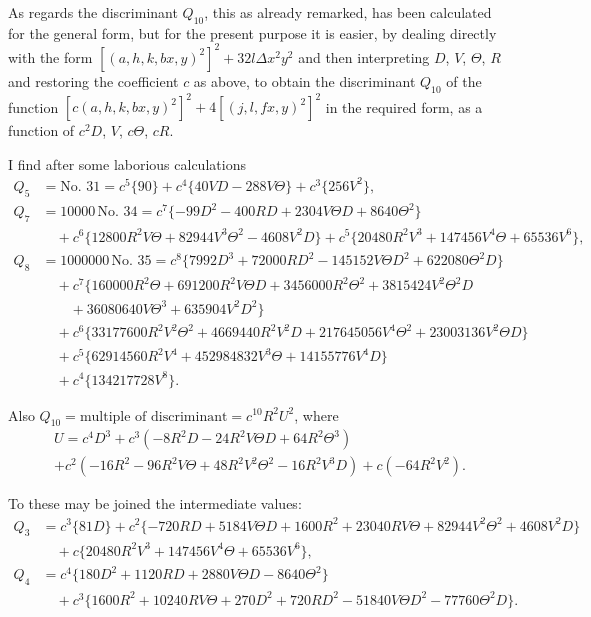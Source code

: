 \documentclass[11pt,a4paper]{article}
\theoremstyle{definition}
\begin{document}
\newpage

As regards the discriminant $Q_{10}$, this as already remarked, has been calculated for the general form, but for the present purpose it is easier, by dealing directly with the form $[(a,h,k,b x,y)^2]^2 + 32l\Delta x^2y^2$ and then interpreting $D$, $V$, $\Theta$, $R$ and restoring the coefficient $c$ as above, to obtain the discriminant $Q_{10}$ of the function $[c(a,h,k,b x,y)^2]^2 + 4[(j,l,f x,y)^2]^2$ in the required form, as a function of $c^2D$, $V$, $c\Theta$, $cR$.

I find after some laborious calculations
\begin{align*}
Q_5 &= \text{No.\ 31} = c^5\{90\} + c^4\{40VD - 288V\Theta\} + c^3\{256V^2\},\\
Q_7 &= 10000\,\text{No.\ 34} = c^7\{-99D^2 - 400RD + 2304V\Theta D + 8640\Theta^2\}\\
&\quad + c^6\{12800R^2V\Theta + 82944V^3\Theta^2 - 4608V^2D\} + c^5\{20480R^2V^3 + 147456V^4\Theta + 65536V^6\},\\
Q_8 &= 1000000\,\text{No.\ 35} = c^8\{7992D^3 + 72000RD^2 - 145152V\Theta D^2 + 622080\Theta^2D\}\\
&\quad + c^7\{160000R^2\Theta + 691200R^2V\Theta D + 3456000R^2\Theta^2 + 3815424V^2\Theta^2D\\
&\quad\quad + 36080640V\Theta^3 + 635904V^2D^2\}\\
&\quad + c^6\{33177600R^2V^2\Theta^2 + 4669440R^2V^2D + 217645056V^4\Theta^2 + 23003136V^2\Theta D\}\\
&\quad + c^5\{62914560R^2V^4 + 452984832V^3\Theta + 14155776V^4D\}\\
&\quad + c^4\{134217728V^8\}.
\end{align*}

Also $Q_{10} = \text{multiple of discriminant} = c^{10}R^2U^2$, where
\begin{multline*}
U = c^4D^3 + c^3(-8R^2D - 24R^2V\Theta D + 64R^2\Theta^3) \\
+ c^2(-16R^2 - 96R^2V\Theta + 48R^2V^2\Theta^2 - 16R^2V^3D) + c(-64R^2V^2).
\end{multline*}

To these may be joined the intermediate values:
\begin{align*}
Q_3 &= c^3\{81D\} + c^2\{-720RD + 5184V\Theta D + 1600R^2 + 23040RV\Theta + 82944V^2\Theta^2 + 4608V^2D\}\\
&\quad + c\{20480R^2V^3 + 147456V^4\Theta + 65536V^6\},\\
Q_4 &= c^4\{180D^2 + 1120RD + 2880V\Theta D - 8640\Theta^2\}\\
&\quad + c^3\{1600R^2 + 10240RV\Theta + 270D^2 + 720RD^2 - 51840V\Theta D^2 - 77760\Theta^2D\}.
\end{align*}
\end{document}
